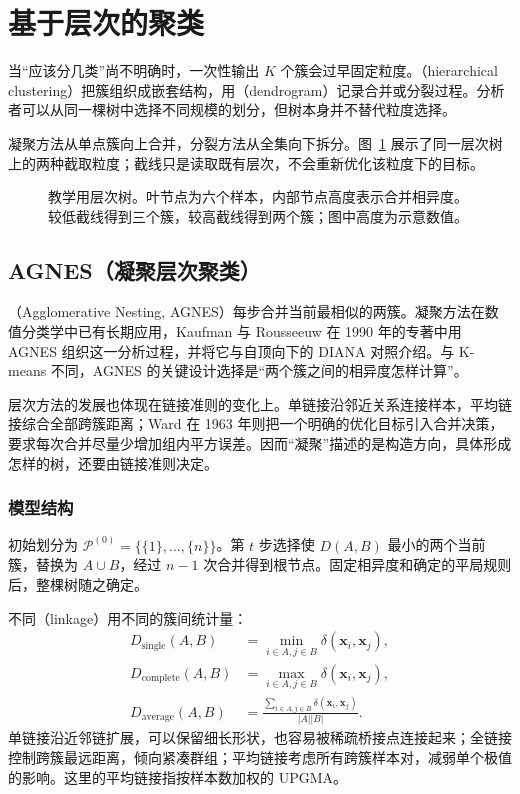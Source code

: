 \section{基于层次的聚类}
\label{sec:clustering-hierarchy}

当“应该分几类”尚不明确时，一次性输出 $K$ 个簇会过早固定粒度。（hierarchical clustering）把簇组织成嵌套结构，用（dendrogram）记录合并或分裂过程。分析者可以从同一棵树中选择不同规模的划分，但树本身并不替代粒度选择。

凝聚方法从单点簇向上合并，分裂方法从全集向下拆分。图~\ref{fig:clustering-dendrogram} 展示了同一层次树上的两种截取粒度；截线只是读取既有层次，不会重新优化该粒度下的目标。

\begin{figure}[htbp]
 \centering
 
 \caption{教学用层次树。叶节点为六个样本，内部节点高度表示合并相异度。较低截线得到三个簇，较高截线得到两个簇；图中高度为示意数值。}
 \label{fig:clustering-dendrogram}
\end{figure}

\subsection{AGNES（凝聚层次聚类）}
\label{sec:clustering-agnes}

（Agglomerative Nesting, AGNES）每步合并当前最相似的两簇。凝聚方法在数值分类学中已有长期应用，Kaufman 与 Rousseeuw 在 1990 年的专著中用 AGNES 组织这一分析过程，并将它与自顶向下的 DIANA 对照介绍。与 K-means 不同，AGNES 的关键设计选择是“两个簇之间的相异度怎样计算”。

层次方法的发展也体现在链接准则的变化上。单链接沿邻近关系连接样本，平均链接综合全部跨簇距离；Ward 在 1963 年则把一个明确的优化目标引入合并决策，要求每次合并尽量少增加组内平方误差。因而“凝聚”描述的是构造方向，具体形成怎样的树，还要由链接准则决定。

\subsubsection{模型结构}

初始划分为 $\mathcal{P}^{(0)}=\{\{1\},\ldots,\{n\}\}$。第 $t$ 步选择使 $D(A,B)$ 最小的两个当前簇，替换为 $A\cup B$，经过 $n-1$ 次合并得到根节点。固定相异度和确定的平局规则后，整棵树随之确定。

不同（linkage）用不同的簇间统计量：
\begin{align*}
 D_{\mathrm{single}}(A,B)
   &=\min_{i\in A,j\in B}\delta(\bm{x}_i,\bm{x}_j),\\
 D_{\mathrm{complete}}(A,B)
   &=\max_{i\in A,j\in B}\delta(\bm{x}_i,\bm{x}_j),\\
 D_{\mathrm{average}}(A,B)
   &=\frac{\sum_{i\in A,j\in B}\delta(\bm{x}_i,\bm{x}_j)}
   {|A||B|}.
\end{align*}
单链接沿近邻链扩展，可以保留细长形状，也容易被稀疏桥接点连接起来；全链接控制跨簇最远距离，倾向紧凑群组；平均链接考虑所有跨簇样本对，减弱单个极值的影响。这里的平均链接指按样本数加权的 UPGMA。

